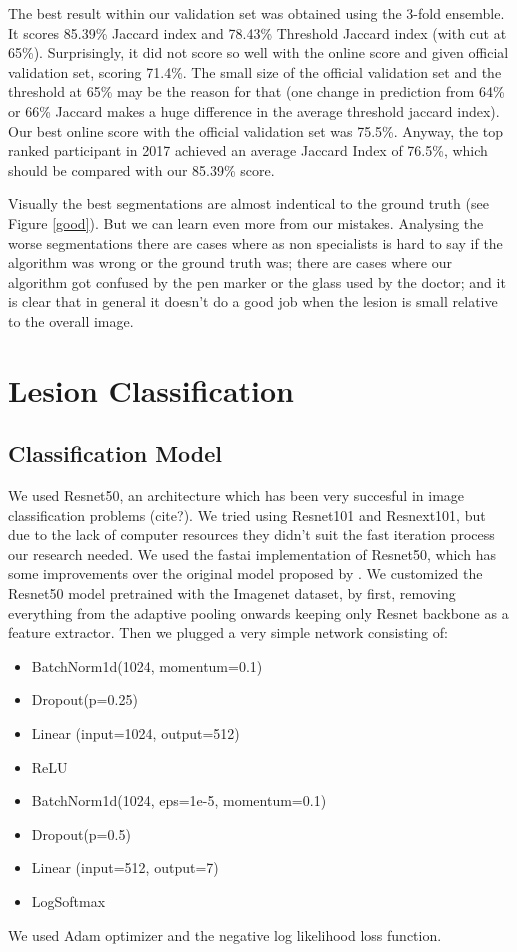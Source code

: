 \documentclass[conference]{IEEEtran}
\begin{document}
The best result within our validation set was obtained using the 3-fold ensemble.  It scores 85.39\% Jaccard index and 78.43\% Threshold Jaccard index (with cut at 65\%). Surprisingly, it did not score so well with the online score and given official validation set, scoring 71.4\%.  The small size of the official validation set and the threshold at 65\% may be the reason for that (one change in prediction from 64\% or 66\% Jaccard makes a huge difference in the average threshold jaccard index). Our best online score with the official validation set was 75.5\%. Anyway, the top ranked participant in 2017 achieved an average Jaccard Index of 76.5\%, which should be compared with our 85.39\% score.

Visually the best segmentations are almost indentical to the ground truth (see Figure \ref{good}). But we can learn even more from our mistakes. Analysing the worse segmentations there are cases where as non specialists is hard to say if the algorithm was wrong or the ground truth was; there are cases where our algorithm got confused by the pen marker or the glass used by the doctor; and it is clear that in general it doesn't do a good job when the lesion is small relative to the overall image. 

\section{Lesion Classification}
\label{classification}

\subsection{Classification Model}
We used Resnet50, an architecture which has been very succesful in image classification problems (cite?). We tried using Resnet101 and Resnext101, but due to the lack of computer resources they didn't suit the fast iteration process our research needed. We used the fastai implementation of Resnet50, which has some improvements over the original model proposed by \cite{resnet}. We customized the Resnet50 model pretrained with the Imagenet dataset, by first, removing everything from the adaptive pooling onwards keeping only Resnet backbone as a feature extractor. Then we plugged a very simple network consisting of:
\begin{itemize}
\item BatchNorm1d(1024, momentum=0.1)
\item Dropout(p=0.25)
\item Linear (input=1024, output=512)
\item ReLU 
\item BatchNorm1d(1024, eps=1e-5, momentum=0.1)
\item Dropout(p=0.5)
\item Linear (input=512, output=7)
\item LogSoftmax
\end{itemize}
We used Adam optimizer and the negative log likelihood loss function.
\end{document}
